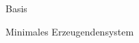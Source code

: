 \documentclass[class=article, crop=false]{standalone}
\begin{document}
\begin{zettel}{Basis}
\begin{flashcard}[]{}
	Minimales Erzeugendensystem

\end{flashcard}

\end{zettel}
\end{document}
